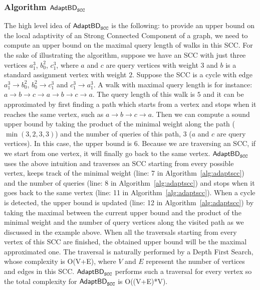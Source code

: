 \subsubsection{Algorithm $\mathsf{AdaptBD}_{\mathtt{SCC}}$}
The high level idea of $\mathsf{AdaptBD}_{\mathtt{SCC}}$ is the following:
to provide an upper bound on the local adaptivity of an Strong Connected Component of a graph, 
we need to compute an upper bound on the maximal query length of walks in this SCC. 
For the sake of illustrating the algorithm, suppose we have an SCC with just three vertices $a^{3}_{1}$, $b^{2}_{0}$,
$c^{3}_{1}$, where $a$ and $c$ are query vertices with weight $3$ and $b$ is a standard assignment vertex with weight $2$. Suppose the SCC is a cycle with edge $a^{3}_{1} \to b^{2}_{0}$, $b^{2}_{0} \to c^{3}_{1}$ and $c^{3}_{1}\to a^{3}_{1}$. 
%
A walk with maximal query length is for instance: $a \to b \to c \to a \to b \to c \to a$. The query length of this walk is $5$ and it can be approximated by
 first finding a path which starts from a vertex and stops when it reaches the same vertex, such as $a \to b \to c \to a$. Then we can compute a sound upper bound by taking the product of 
 the minimal weight along the path ($\min(3,2,3,3)$) and the number of queries of this path, $3$ ($a$ and $c$ are query vertices). In this case, the upper bound is $6$.
Because we are
 traversing an SCC, if we start from one vertex, it will finally go back to the same vertex.   
 $\mathsf{AdaptBD}_{\mathtt{SCC}}$ uses the above intuition and traverses an SCC starting from every possible
 vertex, keeps track of the minimal weight (line: 7 in Algorithm~\ref{alg:adaptscc}) and the number of queries (line: 8 in Algorithm~\ref{alg:adaptscc}) and 
 stops when it goes back to the same vertex (line: 11 in Algorithm~\ref{alg:adaptscc}). When a cycle is detected,
 the upper bound is updated (line: 12 in Algorithm~\ref{alg:adaptscc}) by taking the maximal between the current upper bound and the product of the minimal weight
 and the number of query vertices along the visited path as we discussed in the example above. When all the traversals starting from 
 every vertex of this SCC are finished, the obtained upper bound will be the maximal approximated one. 
 The traversal is naturally performed by a Depth First Search, whose complexity is O(V+E), where $V$ and $E$ 
 represent the number of vertices and edges in this SCC.  $\mathsf{AdaptBD}_{\mathtt{SCC}}$ performs such 
 a traversal for every vertex so the total complexity for $\mathsf{AdaptBD}_{\mathtt{SCC}}$ is O((V+E)*V).
 


